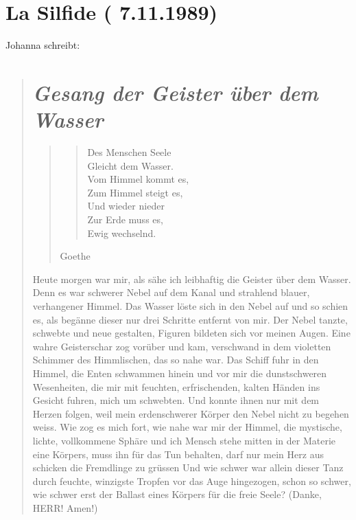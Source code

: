 \documentclass[10pt,titlepage,a5paper]{book}
\newenvironment{tg}{\begin{quote}\em}{\end{quote}}
\newenvironment{dichter}{\begin{flushright}}{\end{flushright}}
\begin{document}
\section*{La Silfide ( 7.11.1989)}


 
Johanna schreibt:

\begin{tg}




\section*{\em Gesang der Geister über dem Wasser}

\begin{tg}
\begin{verse}
Des Menschen Seele\\
Gleicht dem Wasser.\\
Vom Himmel kommt es,\\
Zum Himmel steigt es,\\
Und wieder nieder\\
Zur Erde muss es,\\
Ewig wechselnd.
\end{verse}
\begin{dichter} Goethe \end{dichter}
\end{tg}

Heute morgen war mir, als sähe ich leibhaftig die Geister über dem Wasser.
Denn es war schwerer Nebel auf dem Kanal und strahlend blauer, verhangener Himmel. Das Wasser löste sich in den Nebel auf und so schien es, als begänne dieser nur drei Schritte entfernt von mir. Der Nebel tanzte, schwebte und neue gestalten, Figuren bildeten sich vor meinen Augen. Eine wahre Geisterschar zog vorüber und kam, verschwand in dem violetten Schimmer des Himmlischen, das so nahe war. Das Schiff fuhr in den Himmel, die Enten schwammen hinein und vor mir die dunstschweren Wesenheiten, die mir mit feuchten, erfrischenden, kalten Händen ins Gesicht fuhren, mich um schwebten. Und konnte ihnen nur mit dem Herzen folgen, weil mein erdenschwerer Körper den Nebel nicht zu  begehen weiss. Wie zog es mich fort, wie nahe war mir der Himmel, die mystische, lichte, vollkommene Sphäre und ich Mensch stehe mitten in der Materie eine Körpers, muss ihn für das Tun behalten, darf nur mein Herz aus schicken die Fremdlinge zu grüssen Und wie schwer war allein dieser Tanz durch feuchte, winzigste Tropfen vor das Auge hingezogen, schon so schwer, wie schwer erst der Ballast eines Körpers für die freie Seele? (Danke, HERR! Amen!)


\end{tg}
\end{document}
